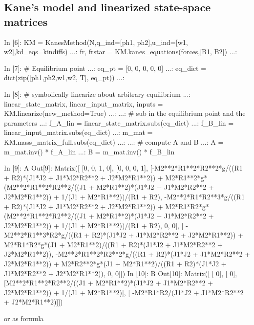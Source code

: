 \subsection{Kane's model and linearized state-space matrices}
\begin{code}
In [6]: KM = KanesMethod(N,q_ind=[ph1, ph2],u_ind=[w1, w2],kd_eqs=kindiffs)
   ...: fr, frstar = KM.kanes_equations(forces,[B1, B2])
   ...: 

In [7]: # Equilibrium point
   ...: eq_pt = [0, 0, 0, 0, 0]
   ...: eq_dict = dict(zip([ph1,ph2,w1,w2, T], eq_pt))
   ...: 

In [8]: # symbolically linearize about arbitrary equilibrium
   ...: linear_state_matrix, linear_input_matrix, inputs = 
KM.linearize(new_method=True)
   ...: 
   ...: # sub in the equilibrium point and the parameters
   ...: f_A_lin = linear_state_matrix.subs(eq_dict)
   ...: f_B_lin = linear_input_matrix.subs(eq_dict)
   ...: m_mat = KM.mass_matrix_full.subs(eq_dict)
   ...: 
   ...: # compute A and B
   ...: A = m_mat.inv() * f_A_lin
   ...: B = m_mat.inv() * f_B_lin
\end{code}

\begin{code}
In [9]: A
Out[9]: 
Matrix([
[0, 0, 1, 0],
[0, 0, 0, 1],
[-M2**2*R1**2*R2**2*g/((R1 + R2)*(J1*J2 + J1*M2*R2**2 + J2*M2*R1**2)) + 
M2*R1**2*g*(M2**2*R1**2*R2**2/((J1 + M2*R1**2)*(J1*J2 + J1*M2*R2**2 + 
J2*M2*R1**2)) + 1/(J1 + M2*R1**2))/(R1 + R2), -M2**2*R1*R2**3*g/((R1 + 
R2)*(J1*J2 + J1*M2*R2**2 + J2*M2*R1**2)) + M2*R1*R2*g*(M2**2*R1**2*R2**2/((J1 + 
M2*R1**2)*(J1*J2 + J1*M2*R2**2 + J2*M2*R1**2)) + 1/(J1 + M2*R1**2))/(R1 + R2), 
0, 0],
[                                           -M2**2*R1**3*R2*g/((R1 + R2)*(J1*J2 
+ J1*M2*R2**2 + J2*M2*R1**2)) + M2*R1*R2*g*(J1 + M2*R1**2)/((R1 + R2)*(J1*J2 + 
J1*M2*R2**2 + J2*M2*R1**2)),                                      
-M2**2*R1**2*R2**2*g/((R1 + R2)*(J1*J2 + J1*M2*R2**2 + J2*M2*R1**2)) + 
M2*R2**2*g*(J1 + M2*R1**2)/((R1 + R2)*(J1*J2 + J1*M2*R2**2 + J2*M2*R1**2)), 0, 
0]])
In [10]: B
Out[10]: 
Matrix([
[                                                                               
           0],
[                                                                               
           0],
[M2**2*R1**2*R2**2/((J1 + M2*R1**2)*(J1*J2 + J1*M2*R2**2 + J2*M2*R1**2)) + 
1/(J1 + M2*R1**2)],
[                                              -M2*R1*R2/(J1*J2 + J1*M2*R2**2 + 
J2*M2*R1**2)]])
\end{code}

or as formula

